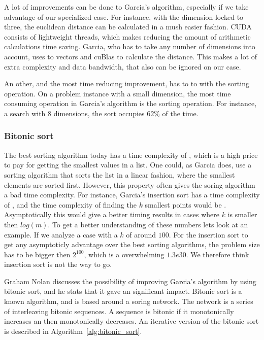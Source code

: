 A lot of improvements can be done to Garcia's algorithm, especially if we take advantage of our specialized case. For instance, with the dimension locked to three, the euclidean distance can be calculated in a mush easier fashion.  CUDA consists of lightweight threads, which makes reducing the amount of arithmetic calculations time saving. Garcia, who has to take any number of dimensions into account, uses to vectors and cuBlas to calculate the distance. This makes a lot of extra complexity and data bandwidth, that also can be ignored on our case.


An other, and the most time reducing improvement, has to to with the sorting operation. On a problem instance with a small dimension, the most time consuming operation in Garcia's algorithm is the sorting operation. For instance, a search with $8$ dimensions, the sort occupies $62\%$ of the time. 

\subsubsection{Bitonic sort} %
\label{ssub:bitonic_sort}


The best sorting algorithm today has a time complexity of , which is a high price to pay for getting the smallest values in a list.  One could, as Garcia does, use a sorting algorithm that sorts the list in a linear fashion, where the smallest elements are sorted first. However, this property often gives the soring algorithm a bad time complexity. For instance, Garcia's insertion sort\cite{Cormen:2001} has a time complexity of , and the time complexity of finding the $k$ smallest points would be . Asymptotically this would give a better timing results in cases where $k$ is smaller then $log(m)$. To get a better understanding of these numbers lets look at an example. If we analyze a case with a $k$ of around $100$. For the insertion sort to get any asymptoticly advantage over the best sorting algorithms, the problem size has to be bigger then $2^{100}$, which is a overwhelming $1.3e30$. We therefore think insertion sort is not the way to go.

Graham Nolan discusses the possibility of improving Garcia's algorithm by using bitonic sort, and he stats that it gave an significant impact\citep{Nolan}. Bitonic sort is a known  algorithm, and is based around a soring network. The network is a series of interleaving bitonic sequences. A sequence is bitonic if it monotonically increases an then monotonically decreases\cite{Cormen:2001}. An iterative version of the bitonic sort is described in Algorithm~\ref{alg:bitonic_sort}.

